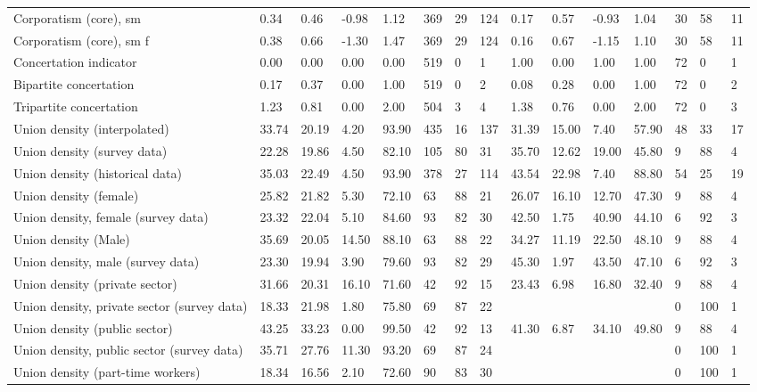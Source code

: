 \begin{longtable}{lllllllllllllll}
\addlinespace
Corporatism (core), sm & 0.34 & 0.46 & -0.98 & 1.12 & 369 & 29 & 124 & 0.17 & 0.57 & -0.93 & 1.04 & 30 & 58 & 11\\
Corporatism (core), sm f & 0.38 & 0.66 & -1.30 & 1.47 & 369 & 29 & 124 & 0.16 & 0.67 & -1.15 & 1.10 & 30 & 58 & 11\\
Concertation indicator & 0.00 & 0.00 & 0.00 & 0.00 & 519 & 0 & 1 & 1.00 & 0.00 & 1.00 & 1.00 & 72 & 0 & 1\\
Bipartite concertation & 0.17 & 0.37 & 0.00 & 1.00 & 519 & 0 & 2 & 0.08 & 0.28 & 0.00 & 1.00 & 72 & 0 & 2\\
Tripartite concertation & 1.23 & 0.81 & 0.00 & 2.00 & 504 & 3 & 4 & 1.38 & 0.76 & 0.00 & 2.00 & 72 & 0 & 3\\
\addlinespace
Union density (interpolated) & 33.74 & 20.19 & 4.20 & 93.90 & 435 & 16 & 137 & 31.39 & 15.00 & 7.40 & 57.90 & 48 & 33 & 17\\
Union density (survey data) & 22.28 & 19.86 & 4.50 & 82.10 & 105 & 80 & 31 & 35.70 & 12.62 & 19.00 & 45.80 & 9 & 88 & 4\\
Union density (historical data) & 35.03 & 22.49 & 4.50 & 93.90 & 378 & 27 & 114 & 43.54 & 22.98 & 7.40 & 88.80 & 54 & 25 & 19\\
Union density (female) & 25.82 & 21.82 & 5.30 & 72.10 & 63 & 88 & 21 & 26.07 & 16.10 & 12.70 & 47.30 & 9 & 88 & 4\\
Union density, female (survey data) & 23.32 & 22.04 & 5.10 & 84.60 & 93 & 82 & 30 & 42.50 & 1.75 & 40.90 & 44.10 & 6 & 92 & 3\\
\addlinespace
Union density (Male) & 35.69 & 20.05 & 14.50 & 88.10 & 63 & 88 & 22 & 34.27 & 11.19 & 22.50 & 48.10 & 9 & 88 & 4\\
Union density, male (survey data) & 23.30 & 19.94 & 3.90 & 79.60 & 93 & 82 & 29 & 45.30 & 1.97 & 43.50 & 47.10 & 6 & 92 & 3\\
Union density (private sector) & 31.66 & 20.31 & 16.10 & 71.60 & 42 & 92 & 15 & 23.43 & 6.98 & 16.80 & 32.40 & 9 & 88 & 4\\
Union density, private sector (survey data) & 18.33 & 21.98 & 1.80 & 75.80 & 69 & 87 & 22 &  &  &  &  & 0 & 100 & 1\\
Union density (public sector) & 43.25 & 33.23 & 0.00 & 99.50 & 42 & 92 & 13 & 41.30 & 6.87 & 34.10 & 49.80 & 9 & 88 & 4\\
\addlinespace
Union density, public sector (survey data) & 35.71 & 27.76 & 11.30 & 93.20 & 69 & 87 & 24 &  &  &  &  & 0 & 100 & 1\\
Union density (part-time workers) & 18.34 & 16.56 & 2.10 & 72.60 & 90 & 83 & 30 &  &  &  &  & 0 & 100 & 1\\

\end{longtable}
